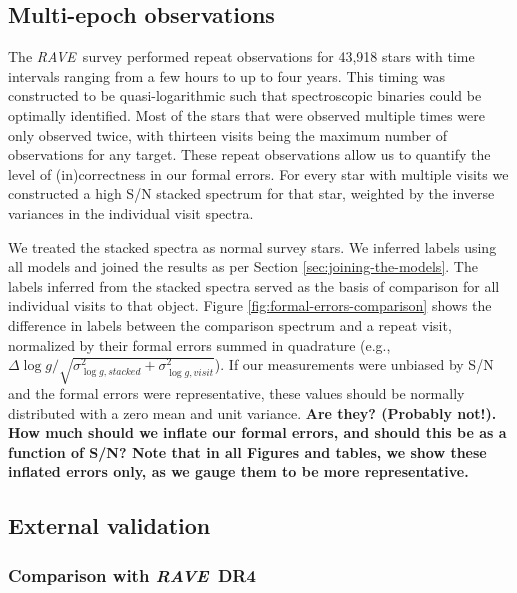 \documentclass[preprint,trackchanges]{aastex}
\newcommand{\acronym}[1]{{\small{#1}}}
\newcommand{\project}[1]{\textsl{#1}}
\newcommand{\rave}{\project{\acronym{RAVE}}}
\newcommand{\stub}[1]{{\color{blue} \textbf{#1}}}
\newcommand{\logg}{\log g}
\begin{document}
\subsection{Multi-epoch observations}
\label{sec:repeat-observations}

The \rave\ survey performed repeat observations for 43,918 stars with time 
intervals ranging from a few hours to up to four years.  This timing was 
constructed to be quasi-logarithmic such that spectroscopic binaries could
be optimally identified. Most of the stars that were observed multiple times
were only observed twice, with thirteen visits being the maximum number 
of observations for any target.  These repeat observations allow us to 
quantify the level of (in)correctness in our formal errors.  For every star
with multiple visits we constructed a high S/N stacked spectrum for that
star, weighted by the inverse variances in the individual visit spectra.


We treated the stacked spectra as normal survey stars.  We inferred labels
using all models and joined the results as per Section \ref{sec:joining-the-models}.  The labels inferred from the stacked spectra served as the basis
of comparison for all individual visits to that object.  Figure 
\ref{fig:formal-errors-comparison} shows the difference in labels 
between the comparison spectrum and a repeat visit, normalized by their 
formal errors summed in quadrature (e.g., 
$\Delta\logg/\sqrt{\sigma_{\logg,stacked}^2 + \sigma_{\logg,visit}^2}$).
If our measurements were unbiased by S/N and the formal errors were 
representative, these values should be normally distributed with a zero 
mean and unit variance.
\stub{Are they? (Probably not!). How much should we inflate our formal errors, and should this be as a function of S/N? Note that in all Figures and tables,
we show these inflated errors only, as we gauge them to be more representative.}


\subsection{External validation}
\label{sec:external-validation}

\subsubsection{Comparison with \rave\ DR4}
\label{sec:validation-kordopatis}
\end{document}
